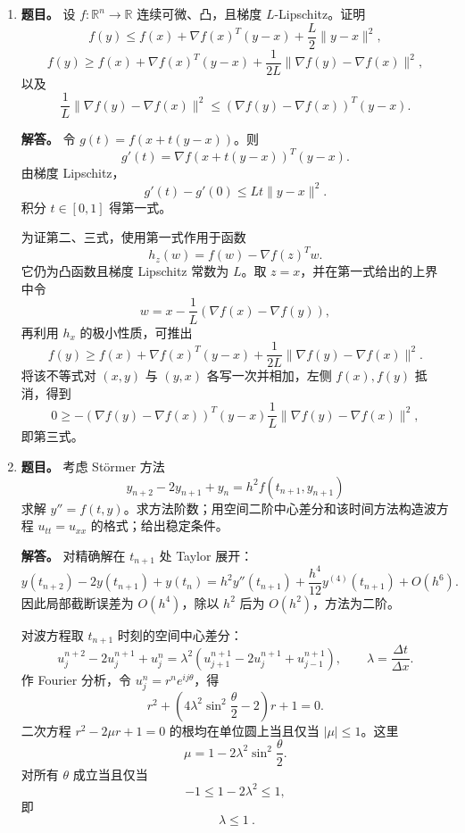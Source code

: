 ﻿\documentclass[UTF8,12pt]{ctexart}
\begin{document}
\begin{enumerate}[label=\textbf{\arabic*.},leftmargin=2.2em]
\textbf{解答。} 若 \(A(u,v)^T=0\)，则
\[
u+Xv=0,\qquad X^Tu=0.
\]
代入得
\[
-X^TXv=0.
\]
因 \(X\) 满列秩，\(X^TX\) 正定，故 \(v=0\)，再得 \(u=0\)。所以 \(A\) 非奇异。

设 \(X\) 的奇异值为 \(s_1,\ldots,s_m>0\)。在与每个左右奇异向量张成的二维空间上，\(A\) 的矩阵为
\[
\begin{pmatrix}1&s_i\\s_i&0\end{pmatrix},
\]
其特征值为
\[
\lambda_i^\pm=\frac{1\pm\sqrt{1+4s_i^2}}2.
\]
此外，\(X^T\) 的零空间维数为 \(n-m\)，在该空间上 \(A\) 的特征值为 \(1\)。故全部特征值为上述数值。

迭代误差满足
\[
e_{k+1}=(I-A)e_k.
\]
对任意初值收敛当且仅当 \(\rho(I-A)<1\)，即所有特征值 \(\lambda\) 满足 \(|1-\lambda|<1\)。但只要 \(s_i>0\)，就有
\[
\lambda_i^-=\frac{1-\sqrt{1+4s_i^2}}2<0,
\]
从而 \(|1-\lambda_i^-|>1\)。因此在题设 \(X\) 满列秩且 \(m>0\) 下，该迭代不可能对任意 \(b\) 收敛；只有退化情形 \(m=0\) 或无耦合 \(X=0\) 时才满足条件。

\item \textbf{题目。} 设 \(f:\mathbb R^n\to\mathbb R\) 连续可微、凸，且梯度 \(L\)-Lipschitz。证明
\[
f(y)\le f(x)+\nabla f(x)^T(y-x)+\frac L2\|y-x\|^2,
\]
\[
f(y)\ge f(x)+\nabla f(x)^T(y-x)+\frac1{2L}\|\nabla f(y)-\nabla f(x)\|^2,
\]
以及
\[
\frac1L\|\nabla f(y)-\nabla f(x)\|^2
\le(\nabla f(y)-\nabla f(x))^T(y-x).
\]

\textbf{解答。} 令 \(g(t)=f(x+t(y-x))\)。则
\[
g'(t)=\nabla f(x+t(y-x))^T(y-x).
\]
由梯度 Lipschitz，
\[
g'(t)-g'(0)\le Lt\|y-x\|^2.
\]
积分 \(t\in[0,1]\) 得第一式。

为证第二、三式，使用第一式作用于函数
\[
h_z(w)=f(w)-\nabla f(z)^Tw.
\]
它仍为凸函数且梯度 Lipschitz 常数为 \(L\)。取 \(z=x\)，并在第一式给出的上界中令
\[
w=x-\frac1L(\nabla f(x)-\nabla f(y)),
\]
再利用 \(h_x\) 的极小性质，可推出
\[
f(y)\ge f(x)+\nabla f(x)^T(y-x)+\frac1{2L}\|\nabla f(y)-\nabla f(x)\|^2.
\]
将该不等式对 \((x,y)\) 与 \((y,x)\) 各写一次并相加，左侧 \(f(x),f(y)\) 抵消，得到
\[
0\ge
-(\nabla f(y)-\nabla f(x))^T(y-x)
\frac1L\|\nabla f(y)-\nabla f(x)\|^2,
\]
即第三式。

\item \textbf{题目。} 考虑 Störmer 方法
\[
y_{n+2}-2y_{n+1}+y_n=h^2 f(t_{n+1},y_{n+1})
\]
求解 \(y''=f(t,y)\)。求方法阶数；用空间二阶中心差分和该时间方法构造波方程 \(u_{tt}=u_{xx}\) 的格式；给出稳定条件。

\textbf{解答。} 对精确解在 \(t_{n+1}\) 处 Taylor 展开：
\[
y(t_{n+2})-2y(t_{n+1})+y(t_n)
=h^2y''(t_{n+1})+\frac{h^4}{12}y^{(4)}(t_{n+1})+O(h^6).
\]
因此局部截断误差为 \(O(h^4)\)，除以 \(h^2\) 后为 \(O(h^2)\)，方法为二阶。

对波方程取 \(t_{n+1}\) 时刻的空间中心差分：
\[
u_j^{n+2}-2u_j^{n+1}+u_j^n
=\lambda^2\left(u_{j+1}^{n+1}-2u_j^{n+1}+u_{j-1}^{n+1}\right),
\qquad \lambda=\frac{\Delta t}{\Delta x}.
\]
作 Fourier 分析，令 \(u_j^n=r^n e^{ij\theta}\)，得
\[
r^2+\left(4\lambda^2\sin^2\frac\theta2-2\right)r+1=0.
\]
二次方程 \(r^2-2\mu r+1=0\) 的根均在单位圆上当且仅当 \(|\mu|\le1\)。这里
\[
\mu=1-2\lambda^2\sin^2\frac\theta2.
\]
对所有 \(\theta\) 成立当且仅当
\[
-1\le1-2\lambda^2\le1,
\]
即
\[
\boxed{\ \lambda\le1\ }.
\]
\end{enumerate}
\end{document}

